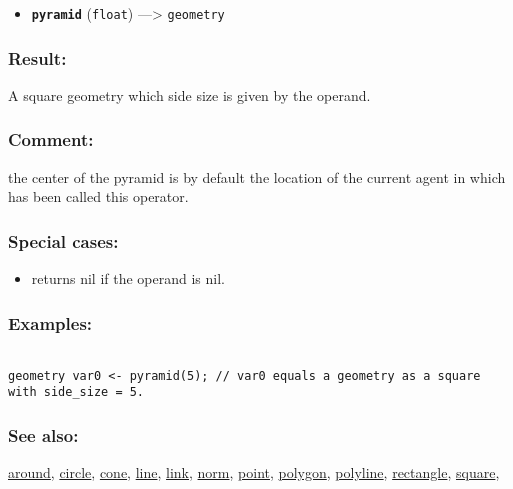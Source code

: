 \documentclass[]{book}
\providecommand{\tightlist}{%
  \setlength{\itemsep}{0pt}\setlength{\parskip}{0pt}}
\theoremstyle{definition}
\theoremstyle{definition}
\theoremstyle{definition}
\theoremstyle{remark}
\begin{document}
\begin{itemize}
\tightlist
\item
  \textbf{\texttt{pyramid}} (\texttt{float}) ---\textgreater{}
  \texttt{geometry}
\end{itemize}

\subsubsection{Result:}\label{result-409}

A square geometry which side size is given by the operand.

\subsubsection{Comment:}\label{comment-80}

the center of the pyramid is by default the location of the current
agent in which has been called this operator.

\subsubsection{Special cases:}\label{special-cases-115}

\begin{itemize}
\tightlist
\item
  returns nil if the operand is nil.
\end{itemize}

\subsubsection{Examples:}\label{examples-293}

\begin{verbatim}
 
geometry var0 <- pyramid(5); // var0 equals a geometry as a square with side_size = 5.
\end{verbatim}

\subsubsection{See also:}\label{see-also-171}

\href{OperatorsAA\#around}{around}, \href{OperatorsBC\#circle}{circle},
\href{OperatorsBC\#cone}{cone}, \href{OperatorsIM\#line}{line},
\href{OperatorsIM\#link}{link}, \href{OperatorsNR\#norm}{norm},
\href{OperatorsNR\#point}{point}, \href{OperatorsNR\#polygon}{polygon},
\href{OperatorsNR\#polyline}{polyline},
\href{OperatorsNR\#rectangle}{rectangle},
\href{OperatorsSZ\#square}{square},
\end{document}
